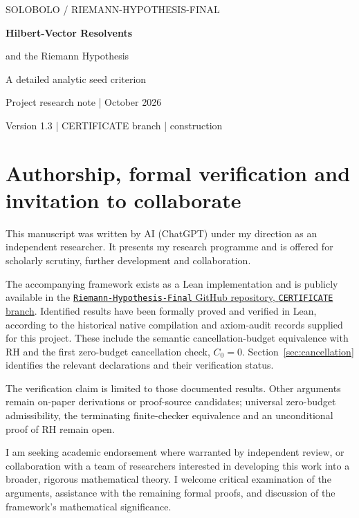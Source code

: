 \documentclass[11pt,a4paper]{article}
\numberwithin{equation}{section}
\theoremstyle{definition}
\theoremstyle{remark}
\begin{document}
\begin{center}
{\small\sffamily\color{linkblue} SOLOBOLO \enspace / \enspace RIEMANN-HYPOTHESIS-FINAL}\par
\vspace{9pt}
{\LARGE\bfseries\color{ink} Hilbert-Vector Resolvents\par
and the Riemann Hypothesis}\par
\vspace{7pt}
{\large A detailed analytic seed criterion}\par
\vspace{9pt}
{\small Project research note \enspace |  October 2026}\par
{\small Version 1.3 \enspace | \enspace CERTIFICATE branch \enspace | \enspace construction}
\end{center}
\vspace{5pt}
\section*{Authorship, formal verification and invitation to collaborate}

This manuscript was written by AI (ChatGPT) under my direction as an
independent researcher. It presents my research programme and is offered
for scholarly scrutiny, further development and collaboration.

The accompanying framework exists as a Lean implementation and is
publicly available in the
\href{https://github.com/randogelist/Riemann-Hypothesis-Final/tree/CERTIFICATE}{\texttt{Riemann-Hypothesis-Final} GitHub repository, \texttt{CERTIFICATE} branch}.
Identified results have been formally proved and verified in Lean,
according to the historical native compilation and axiom-audit records
supplied for this project. These include the semantic cancellation-budget
equivalence with RH and the first zero-budget cancellation check,
$C_0=0$. Section~\ref{sec:cancellation} identifies the relevant declarations
and their verification status.

The verification claim is limited to those documented results. Other
arguments remain on-paper derivations or proof-source candidates;
universal zero-budget admissibility, the terminating finite-checker
equivalence and an unconditional proof of RH remain open.

I am seeking academic endorsement where warranted by independent review,
or collaboration with a team of researchers interested in developing this
work into a broader, rigorous mathematical theory. I welcome critical
examination of the arguments, assistance with the remaining formal proofs,
and discussion of the framework's mathematical significance.
\end{document}

